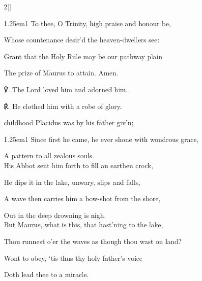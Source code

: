 \begin{paracol}{2}[]
\begin{hangparas}{1.25em}{1}
To thee, O Trinity, high praise and honour be,

Whose countenance desir'd the heaven-dwellers see:

Grant that the Holy Rule may be our pathway plain

The prize of Maurus to attain.  Amen.\\
\end{hangparas}

	℣. The Lord loved him and adorned him.

	℟. He clothed him with a robe of glory.
	
	
	\switchcolumn

\vspace{-1\baselineskip}

\mattins


\mattinsInvitatoryHymn\label{MaurusInvitatory}
 childhood Placidus was by his father giv'n;


\begin{hangparas}{1.25em}{1}
Since first he came, he ever shone with wondrous grace,

A pattern to all zealous souls.\\

His Abbot sent him forth to fill an earthen crock,

He dips it in the lake, unwary, slips and falls,

A wave then carries him a bow-shot from the shore,

Out in the deep drowning is nigh.\\

But Maurus, what is this, that hast'ning to the lake,

Thou runnest o'er the waves as though thou wast on land?

Wont to obey, `tis thus thy holy father's voice

Doth lead thee to a miracle.\\


\end{hangparas}
\end{paracol}
